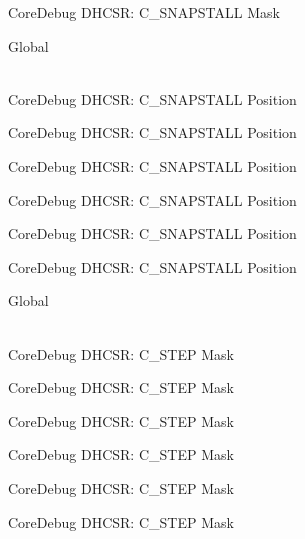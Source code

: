 \begin{DoxyRefList}
\label{deprecated__deprecated000585}%
%
Core\+Debug DHCSR\+: C\+\_\+\+SNAPSTALL Mask  
\item[{\parbox[t]{\linewidth}{Global \doxylink{group___c_m_s_i_s___core_debug_ga85747214e2656df6b05ec72e4d22bd6d}{Core\+Debug\+\_\+\+DHCSR\+\_\+\+C\+\_\+\+SNAPSTALL\+\_\+\+Pos} }}]\hfill \\
\label{deprecated__deprecated000031}%
%
Core\+Debug DHCSR\+: C\+\_\+\+SNAPSTALL Position 

\label{deprecated__deprecated000175}%
%
Core\+Debug DHCSR\+: C\+\_\+\+SNAPSTALL Position 

\label{deprecated__deprecated000317}%
%
Core\+Debug DHCSR\+: C\+\_\+\+SNAPSTALL Position 

\label{deprecated__deprecated000393}%
%
Core\+Debug DHCSR\+: C\+\_\+\+SNAPSTALL Position 

\label{deprecated__deprecated000482}%
%
Core\+Debug DHCSR\+: C\+\_\+\+SNAPSTALL Position 

\label{deprecated__deprecated000584}%
%
Core\+Debug DHCSR\+: C\+\_\+\+SNAPSTALL Position  
\item[{\parbox[t]{\linewidth}{Global \doxylink{group___c_m_s_i_s___core_debug_gae6bda72fbd32cc5734ff3542170dc00d}{Core\+Debug\+\_\+\+DHCSR\+\_\+\+C\+\_\+\+STEP\+\_\+\+Msk} }}]\hfill \\
\label{deprecated__deprecated000036}%
%
Core\+Debug DHCSR\+: C\+\_\+\+STEP Mask 

\label{deprecated__deprecated000124}%
%
Core\+Debug DHCSR\+: C\+\_\+\+STEP Mask 

\label{deprecated__deprecated000180}%
%
Core\+Debug DHCSR\+: C\+\_\+\+STEP Mask 

\label{deprecated__deprecated000263}%
%
Core\+Debug DHCSR\+: C\+\_\+\+STEP Mask 

\label{deprecated__deprecated000322}%
%
Core\+Debug DHCSR\+: C\+\_\+\+STEP Mask 

\label{deprecated__deprecated000398}%
%
Core\+Debug DHCSR\+: C\+\_\+\+STEP Mask 


\end{DoxyRefList}
